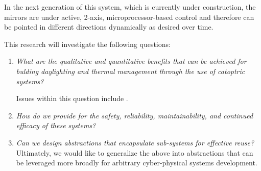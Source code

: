 In the next generation of this system, which is currently under construction,
the mirrors are under active, 2-axis, microprocessor-based control and
therefore can be pointed in different directions dynamically as desired
over time.





This research will investigate the following questions:
\begin{enumerate}

\item \emph{What are the qualitative and quantitative benefits
that can be achieved for bulding daylighting and thermal management
through the use of catoptric systems?}

Issues within this question include .

\item \emph{How do we provide for the safety, reliability, maintainability, and
continued efficacy of these systems?}

\item \emph{Can we design abstractions that encapsulate sub-systems for
effective reuse?}
Ultimately, we would like to generalize the above into abstractions that can be
leveraged more broadly for arbitrary cyber-physical systems development.

\end{enumerate}

